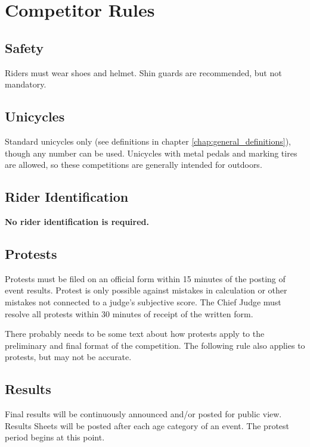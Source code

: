 \chapter{Competitor Rules}

\section{Safety}

Riders must wear shoes and helmet.
Shin guards are recommended, but not mandatory.

\section{Unicycles}

Standard unicycles only (see definitions in chapter \ref{chap:general_definitions}), though any number can be used.
Unicycles with metal pedals and marking tires are allowed, so these competitions are generally intended for outdoors.

\section{Rider Identification}

\textbf{No rider identification is required.}

\section{Protests}

Protests must be filed on an official form within 15 minutes of the posting of event results.
Protest is only possible against mistakes in calculation or other mistakes not connected to a judge's subjective score.
The Chief Judge must resolve all protests within 30 minutes of receipt of the written form.

\begin{comment2016}
There probably needs to be some text about how protests apply to the preliminary and final format of the competition.  The following rule also applies to protests, but may not be accurate.
\end{comment2016}

\section{Results}
Final results will be continuously announced and/or posted for public view.
Results Sheets will be posted after each age category of an event.
The protest period begins at this point.

